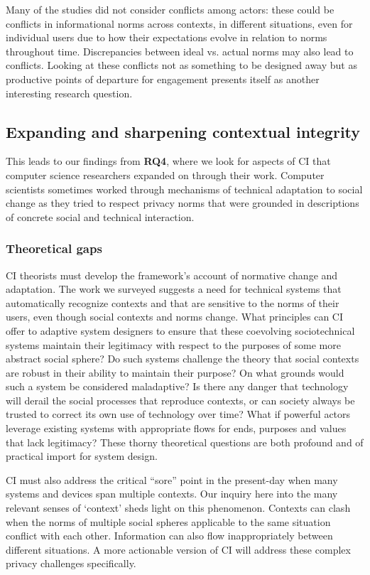 \documentclass[../thesis.tex]{subfiles}
\begin{document}
Many of the studies did not consider conflicts among actors: these could
be conflicts in informational norms across contexts, in different
situations, even for individual users due to how their expectations
evolve in relation to norms throughout time. Discrepancies between
ideal vs. actual norms may also lead to conflicts. Looking at these
conflicts not as something to be designed away but as productive points
of departure for engagement presents itself as another interesting
research question.

\subsection{Expanding and sharpening contextual integrity}
\label{CI5.4}

This leads to our findings from \textbf{RQ4}, where we look for aspects
of CI that computer science researchers expanded on through their work.
Computer scientists sometimes worked through mechanisms of technical
adaptation to social change as they tried to respect privacy norms that
were grounded in descriptions of concrete social and technical
interaction. 

\subsubsection{Theoretical gaps}
\label{CI5.4.1}

CI theorists must develop the framework's account of
normative change and adaptation. The work we surveyed suggests a need
for technical systems that automatically recognize contexts and that
are sensitive to the norms of their users, even though social contexts
and norms change. What principles can CI offer to adaptive system
designers to ensure that these coevolving sociotechnical systems
maintain their legitimacy with respect to the purposes of some more
abstract social sphere? Do such systems challenge the theory that
social contexts are robust in their ability to maintain their purpose?
On what grounds would such a system be considered maladaptive? Is there
any danger that technology will derail the social processes that
reproduce contexts, or can society always be trusted to correct its own
use of technology over time? What if powerful actors leverage existing
systems with appropriate flows for ends, purposes and values that lack
legitimacy? These thorny theoretical questions are both profound and of
practical import for system design.

CI must also address the critical
``sore'' point in the present-day
when many systems and devices span multiple contexts. Our inquiry here
into the many relevant senses of
`context' sheds light on this
phenomenon. Contexts can clash when the norms of multiple social
spheres applicable to the same situation conflict with each other.
Information can also flow inappropriately between different situations.
A more actionable version of CI will address these complex privacy
challenges specifically.
\end{document}
